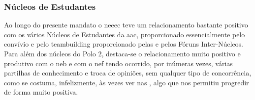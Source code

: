 
\subsubsection{Núcleos de Estudantes}

Ao longo do presente mandato o \acrshort{neeec} teve um relacionamento bastante positivo com os vários Núcleos de Estudantes da \acrshort{aac}, proporcionado essencialmente pelo convívio e pelo teambuilding proporcionado pelas  e pelos Fóruns Inter-Núcleos. Para além dos núcleos do Polo 2, destaca-se o relacionamento muito positivo e produtivo com o \acrfull{neb} e com o \acrfull{nef} tendo ocorrido, por inúmeras vezes, várias partilhas de conhecimento e troca de opiniões, sem qualquer tipo de concorrência, como se costuma, infelizmente, às vezes ver nas , algo que nos permitiu progredir de forma muito positiva.